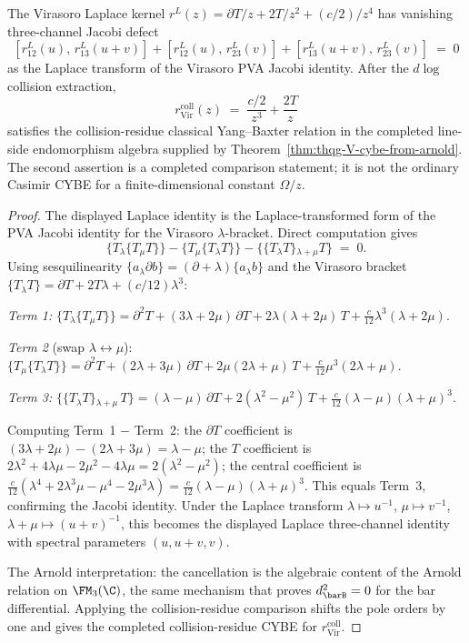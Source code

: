 \begin{proposition}
\label{prop:virasoro-cybe}
The Virasoro Laplace kernel
$r^L(z) = \partial T/z + 2T/z^2 + (c/2)/z^4$
has vanishing three-channel Jacobi defect
\[
[r^L_{12}(u),\, r^L_{13}(u+v)]
+ [r^L_{12}(u),\, r^L_{23}(v)]
+ [r^L_{13}(u+v),\, r^L_{23}(v)]
\;=\; 0
\]
as the Laplace transform of the Virasoro PVA Jacobi identity.  After
the \(d\log\) collision extraction,
\[
r^{\mathrm{coll}}_{\mathrm{Vir}}(z)
\;=\;
\frac{c/2}{z^3}+\frac{2T}{z}
\]
satisfies the collision-residue classical Yang--Baxter relation in the
completed line-side endomorphism algebra supplied by
Theorem~\ref{thm:thqg-V-cybe-from-arnold}.  The second assertion is a
completed comparison statement; it is not the ordinary Casimir CYBE for
a finite-dimensional constant \(\Omega/z\).
\end{proposition}

\begin{proof}
The displayed Laplace identity is the Laplace-transformed form of the
PVA Jacobi identity for the Virasoro $\lambda$-bracket. Direct
computation gives
\[
\{T{}_\lambda\{T{}_\mu T\}\}
- \{T{}_\mu\{T{}_\lambda T\}\}
- \{\{T{}_\lambda T\}{}_{\lambda+\mu} T\}
\;=\; 0.
\]
Using sesquilinearity $\{a{}_\lambda \partial b\} = (\partial +
\lambda)\{a{}_\lambda b\}$ and the Virasoro bracket
$\{T{}_\lambda T\} = \partial T + 2T\lambda + (c/12)\lambda^3$:

\emph{Term 1:}
$\{T{}_\lambda\{T{}_\mu T\}\}
= \partial^2 T + (3\lambda + 2\mu)\,\partial T
+ 2\lambda(\lambda + 2\mu)\,T
+ \tfrac{c}{12}\lambda^3(\lambda + 2\mu)$.

\emph{Term 2} (swap $\lambda \leftrightarrow \mu$):
$\{T{}_\mu\{T{}_\lambda T\}\}
= \partial^2 T + (2\lambda + 3\mu)\,\partial T
+ 2\mu(2\lambda + \mu)\,T
+ \tfrac{c}{12}\mu^3(2\lambda + \mu)$.

\emph{Term 3:}
$\{\{T{}_\lambda T\}{}_{\lambda+\mu}\, T\}
= (\lambda - \mu)\,\partial T + 2(\lambda^2 - \mu^2)\,T
+ \tfrac{c}{12}(\lambda - \mu)(\lambda+\mu)^3$.

Computing Term~1 $-$ Term~2:
the $\partial T$ coefficient is $(3\lambda + 2\mu) - (2\lambda + 3\mu)
= \lambda - \mu$;
the $T$ coefficient is $2\lambda^2 + 4\lambda\mu - 2\mu^2 - 4\lambda\mu
= 2(\lambda^2 - \mu^2)$;
the central coefficient is
$\tfrac{c}{12}(\lambda^4 + 2\lambda^3\mu - \mu^4 - 2\mu^3\lambda)
= \tfrac{c}{12}(\lambda - \mu)(\lambda + \mu)^3$.
This equals Term~3, confirming the Jacobi identity. Under the
Laplace transform $\lambda \mapsto u^{-1}$, $\mu \mapsto v^{-1}$,
$\lambda + \mu \mapsto (u+v)^{-1}$, this becomes the displayed
Laplace three-channel identity with spectral parameters
$(u, u+v, v)$.

The Arnold interpretation: the cancellation is the algebraic
content of the Arnold relation on $\FM_3(\C)$, the same
mechanism that proves $d_{\barB}^2 = 0$ for the bar differential.
Applying the collision-residue comparison shifts the pole orders by one
and gives the completed collision-residue CYBE for
\(r^{\mathrm{coll}}_{\mathrm{Vir}}\).
\end{proof}

